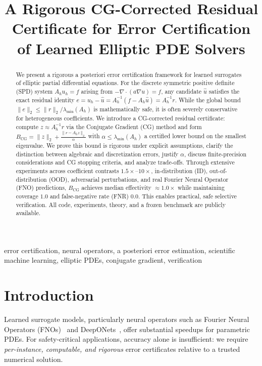 \documentclass[conference]{IEEEtran}
\title{A Rigorous CG-Corrected Residual Certificate for Error Certification of Learned Elliptic PDE Solvers}
\author{\IEEEauthorblockN{certno}\IEEEauthorblockA{Error-Certified Neural Operators Project\\\url{https://github.com/emmettv1191/certno-phd-research}}}
\theoremstyle{plain}
\theoremstyle{definition}
\begin{document}
\maketitle

\begin{abstract}
We present a rigorous a posteriori error certification framework for learned surrogates of elliptic partial differential equations. For the discrete symmetric positive definite (SPD) system $A_h u_h = f$ arising from $-\nabla\cdot(a\nabla u)=f$, any candidate $\hat{u}$ satisfies the exact residual identity $e = u_h - \hat{u} = A_h^{-1}(f - A_h \hat{u}) = A_h^{-1}r$. While the global bound $\|e\|_2 \le \|r\|_2/\lambda_{\min}(A_h)$ is mathematically safe, it is often severely conservative for heterogeneous coefficients. We introduce a CG-corrected residual certificate: compute $z \approx A_h^{-1}r$ via the Conjugate Gradient (CG) method and form $B_{\mathrm{CG}} = \|z\|_2 + \frac{\|r - A_h z\|_2}{\alpha}$ with $\alpha \le \lambda_{\min}(A_h)$ a certified lower bound on the smallest eigenvalue. We prove this bound is rigorous under explicit assumptions, clarify the distinction between algebraic and discretization errors, justify $\alpha$, discuss finite-precision considerations and CG stopping criteria, and analyze trade-offs. Through extensive experiments across coefficient contrasts $1.5\times$--$10\times$, in-distribution (ID), out-of-distribution (OOD), adversarial perturbations, and real Fourier Neural Operator (FNO) predictions, $B_{\mathrm{CG}}$ achieves median effectivity $\approx 1.0\times$ while maintaining coverage $1.0$ and false-negative rate (FNR) $0.0$. This enables practical, safe selective verification. All code, experiments, theory, and a frozen benchmark are publicly available.
\end{abstract}

\begin{IEEEkeywords}
error certification, neural operators, a posteriori error estimation, scientific machine learning, elliptic PDEs, conjugate gradient, verification
\end{IEEEkeywords}

\section{Introduction}
\label{sec:intro}
Learned surrogate models, particularly neural operators such as Fourier Neural Operators (FNOs)~\cite{li2020fourier,kovachki2023neural} and DeepONets~\cite{lu2021learning}, offer substantial speedups for parametric PDEs. For safety-critical applications, accuracy alone is insufficient: we require \emph{per-instance, computable, and rigorous} error certificates relative to a trusted numerical solution.
\end{document}
